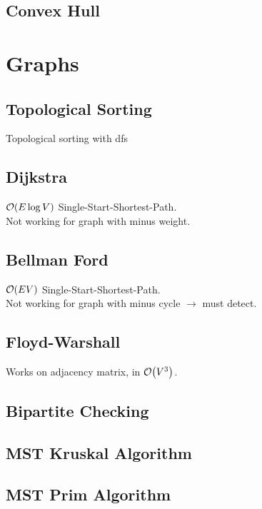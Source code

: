 \documentclass[landscape,8pt]{article}
\begin{document}
\begin{multicols}{2}
  \subsection{Convex Hull}
\columnbreak
\section{Graphs}
  \subsection{Topological Sorting}
  Topological sorting with dfs
    

  \subsection{Dijkstra}
  $\order{E \log V}$ Single-Start-Shortest-Path.\\
  Not working for graph with minus weight.
    

  \subsection{Bellman Ford}
  $\order{EV}$ Single-Start-Shortest-Path.\\
  Not working for graph with minus cycle $\rightarrow$ must detect.
    

  \subsection{Floyd-Warshall}
  Works on adjacency matrix, in $\order{V^3}$.
  

  \subsection{Bipartite Checking}
  
  \subsection{MST Kruskal Algorithm}

  \subsection{MST Prim Algorithm}


\end{multicols}
\end{document}
